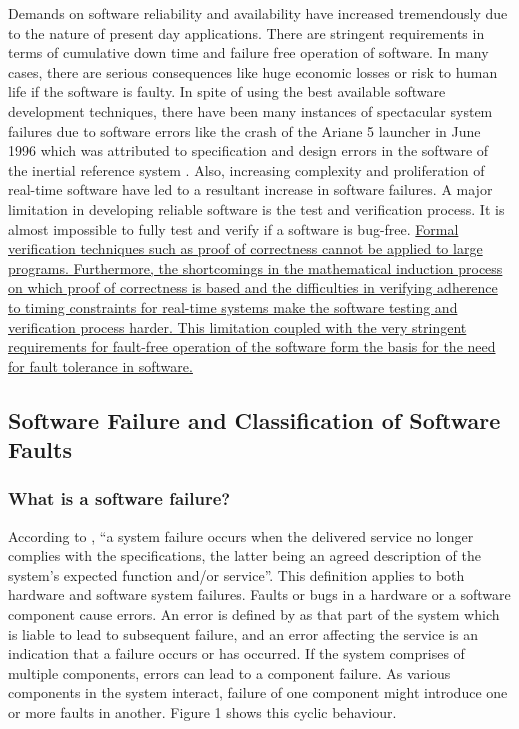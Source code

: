\documentclass[a4paper, 11pt]{article}
\begin{document}
Demands on software reliability and availability have increased tremendously due to the nature of present day applications. There are stringent requirements in terms of cumulative down time and failure free operation of software. In many cases, there are serious consequences like huge economic losses or risk to human life if the software is faulty. In spite of using the best available software development techniques, there have been many instances of spectacular system failures due to software errors like the crash of the Ariane 5 launcher in June 1996 which was attributed to specification and design errors in the software of the inertial reference system \citep{lions1996ariane}. Also, increasing complexity and proliferation of real-time software have led to a resultant increase in software failures. A major limitation in developing reliable software is the test and verification process. It is almost impossible to fully test and verify if a software is bug-free. \ul{Formal verification techniques such as proof of correctness cannot be applied to large programs. Furthermore, the shortcomings in the mathematical induction process on which proof of correctness is based and the difficulties in verifying adherence to timing constraints for real-time systems make the software testing and verification process harder. This limitation coupled with the very stringent requirements for fault-free operation of the software form the basis for the need for fault tolerance in software.}

\subsection{Software Failure and Classification of Software Faults}
\subsubsection{What is a software failure?}
According to \citet{laprie1992dependability}, ``a system failure occurs when the delivered service no longer complies with the specifications, the latter being an agreed description of the system's expected function and/or service''. This definition applies to both hardware and software system failures. Faults or bugs in a hardware or a software component cause errors. An error is defined by \citet{laprie1992dependability} as that part of the system which is liable to lead to subsequent failure, and an error affecting the service is an indication that a failure occurs or has occurred. If the system comprises of multiple components, errors can lead to a component failure. As various components in the system interact, failure of one component might introduce one or more faults in another. Figure 1 shows this cyclic behaviour.
\end{document}
